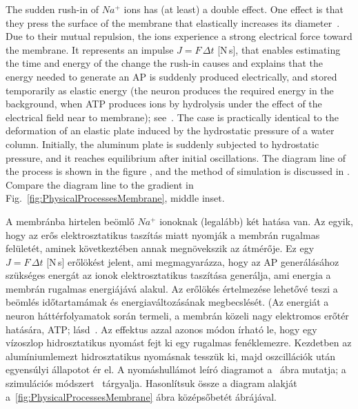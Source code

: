 \ifx\magyar\undefined
The sudden rush-in of
$Na^+$ ions has (at least) a double effect. 
One effect is that they press the surface of the membrane that
elastically increases its diameter~\cite{NeuronalDeformation:2020}.
Due to their mutual repulsion,
the ions experience a strong electrical force toward the membrane. It represents an impulse $J=F\,\Delta t$ [N\,s], that enables estimating the time and energy of the 
change the rush-in causes and explains that the energy needed to 
generate an \gls{AP} is suddenly produced electrically, 
and stored temporarily as elastic energy (the neuron produces the required energy in the background, when \gls{ATP} produces ions by hydrolysis under the effect of the electrical field near to membrane); see~\cite{VeghUnifiedCrossdisciplinaryModel:2026}. 
The case is practically identical to
the deformation of an elastic plate induced by the hydrostatic pressure of a water column. Initially, the aluminum plate is suddenly subjected to hydrostatic pressure, and it reaches equilibrium after initial oscillations. The diagram line of the process is shown in the figure
\cite{HydrostaticWaterColumn:2021}, and the method of simulation is discussed in \cite{Hydrostatic_SPHinXsys:2021}. Compare the diagram line to the
gradient in Fig.~\ref{fig:PhysicalProcessesMembrane}, middle inset.

\else

A membránba hirtelen beömlő $Na^+$ ionoknak (legalább)
két hatása van.
Az egyik, hogy az erős elektrosztatikus taszítás miatt nyomják a
membrán rugalmas felületét, aminek következtében annak
megnövekszik az átmérője.
Ez egy $J=F\,\Delta t$ [N\,s] erőlökést jelent,
ami megmagyarázza, hogy az \gls{AP} generálásához szükséges
energát az ionok elektrosztatikus taszítása generálja,
ami energia a membrán rugalmas energiájává alakul.
Az erőlökés értelmezése lehetővé teszi a beömlés időtartamámak és energiaváltozásának megbecslését.
(Az energiát a neuron háttérfolyamatok során termeli,
a membrán közeli nagy elektromos erőtér hatására, \gls{ATP};
lásd~\cite{VeghUnifiedCrossdisciplinaryModel:2026}. 
Az effektus azzal azonos módon írható le, hogy egy vízoszlop
hidrosztatikus nyomást fejt ki egy rugalmas fenéklemezre.
Kezdetben az alumíniumlemezt hidrosztatikus nyomásnak tesszük ki, majd oszcillációk után egyensúlyi állapotot ér el.
A nyomáshullámot leíró diagramot a~\cite{HydrostaticWaterColumn:2021} ábra mutatja; a szimulációs módszert~\cite{Hydrostatic_SPHinXsys:2021} tárgyalja. 
Hasonlítsuk össze a diagram alakját a~\ref{fig:PhysicalProcessesMembrane} ábra középsőbetét ábrájával.


